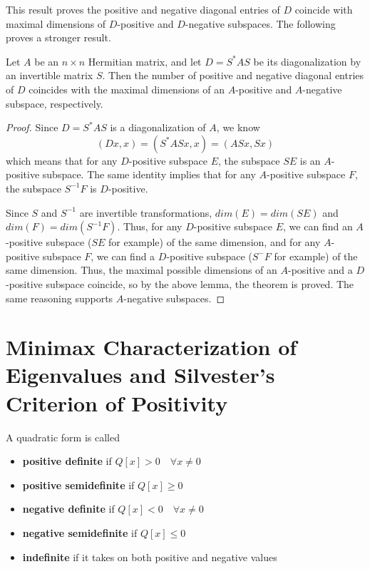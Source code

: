 This result proves the positive and negative diagonal entries of $D$ coincide with maximal dimensions of $D$-positive and $D$-negative subspaces. The following proves a stronger result. 

\begin{theorem}
Let $A$ be an $n \times n$ Hermitian matrix, and let $D = S^{*} AS$ be its diagonalization by an invertible matrix $S$. Then the number of positive and negative diagonal entries of $D$ coincides with the maximal dimensions of an $A$-positive and $A$-negative subspace, respectively. 
\end{theorem}

\begin{proof}
Since $D = S^{*}AS$ is a diagonalization of $A$, we know 
$$(Dx, x) = (S^{*}ASx, x) = (ASx, Sx)$$
which means that for any $D$-positive subspace $E$, the subspace $SE$ is an $A$-positive subspace. The same identity implies that for any $A$-positive subspace $F$, the subspace $S^{-1}F$ is $D$-positive. 

Since $S$ and $S^{-1}$ are invertible transformations, $dim(E) = dim(SE)$ and $dim(F) = dim(S^{-1}F)$. Thus, for any $D$-positive subspace $E$, we can find an $A$-positive subspace ($SE$ for example) of the same dimension, and for any $A$-positive subspace $F$, we can find a $D$-positive subspace ($S^{-}F$ for example) of the same dimension. Thus, the maximal possible dimensions of an $A$-positive and a $D$-positive subspace coincide, so by the above lemma, the theorem is proved. The same reasoning supports $A$-negative subspaces. 
\end{proof}

\section{Minimax Characterization of Eigenvalues and Silvester's Criterion of Positivity}

\begin{definition}
A quadratic form is called 
\begin{itemize}
	\item \textbf{positive definite} if $Q[x] > 0 \quad \forall x \neq 0$
	\item \textbf{positive semidefinite} if $Q[x] \geq 0$
	\item \textbf{negative definite} if $Q[x] < 0 \quad \forall x \neq 0$ 
	\item \textbf{negative semidefinite} if $Q[x] \leq 0$ 
	\item \textbf{indefinite} if it takes on both positive and negative values 
\end{itemize}
\end{definition}

